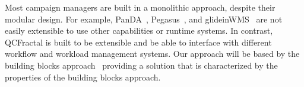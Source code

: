 Most campaign managers are built in a monolithic approach, despite their modular design.
For example, PanDA~\cite{maeno2008panda}, Pegasus~\cite{deelman2015pegasus}, and glideinWMS~\cite{sfiligoi2008glidein} are not easily extensible to use other capabilities or runtime systems.
In contrast, QCFractal is built to be extensible and be able to interface with different workflow and workload management systems.
Our approach will be based by the building blocks approach~\cite{turilli2019middleware} providing a solution that is characterized by the properties of the building blocks approach.
